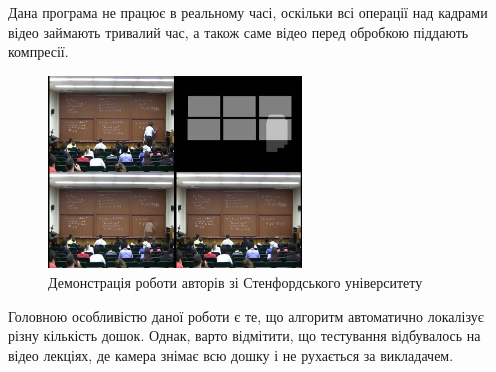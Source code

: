 Дана програма не працює в реальному часі, оскільки всі операції над кадрами
відео займають тривалий час, а також саме відео перед обробкою
піддають компресії.
\begin{figure}[H]
  \centering
  \includegraphics[width=0.6\textwidth]{images/suh}
  \caption{Демонстрація роботи авторів зі Стенфордського університету \cite{suh}
    \label{fig:suh}
  }
\end{figure}
Головною особливістю даної роботи є те, що  алгоритм автоматично локалізує
різну кількість дошок. Однак, варто відмітити, що тестування відбувалось на
відео лекціях, де камера знімає всю дошку і не рухається за викладачем.

